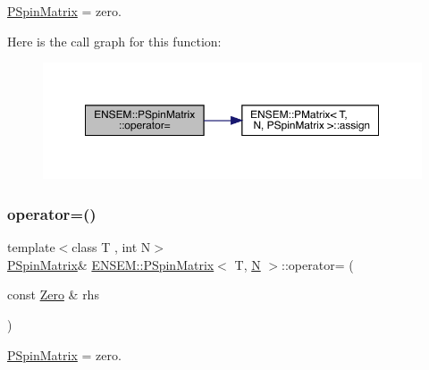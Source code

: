 \mbox{\hyperlink{classENSEM_1_1PSpinMatrix}{P\+Spin\+Matrix}} = zero. 

Here is the call graph for this function\+:
\nopagebreak
\begin{figure}[H]
\begin{center}
\leavevmode
\includegraphics[width=350pt]{d0/d1e/classENSEM_1_1PSpinMatrix_a2a776d9189f8d6fa8f9d9bc6758713c9_cgraph}
\end{center}
\end{figure}
\mbox{\label{classENSEM_1_1PSpinMatrix_a2a776d9189f8d6fa8f9d9bc6758713c9}} 
\subsubsection{\texorpdfstring{operator=()}{operator=()}\hspace{0.1cm}{\footnotesize\ttfamily [3/9]}}
{\footnotesize\ttfamily template$<$class T , int N$>$ \\
\mbox{\hyperlink{classENSEM_1_1PSpinMatrix}{P\+Spin\+Matrix}}\& \mbox{\hyperlink{classENSEM_1_1PSpinMatrix}{E\+N\+S\+E\+M\+::\+P\+Spin\+Matrix}}$<$ T, \mbox{\hyperlink{adat__devel_2lib_2hadron_2operator__name__util_8cc_a7722c8ecbb62d99aee7ce68b1752f337}{N}} $>$\+::operator= (\begin{DoxyParamCaption}\item[{const \mbox{\hyperlink{structENSEM_1_1Zero}{Zero}} \&}]{rhs }\end{DoxyParamCaption})\hspace{0.3cm}{\ttfamily [inline]}}



\mbox{\hyperlink{classENSEM_1_1PSpinMatrix}{P\+Spin\+Matrix}} = zero. 

